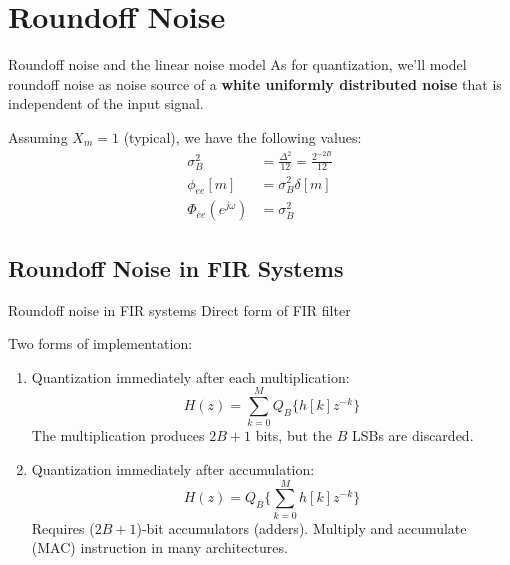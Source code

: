 \documentclass[10pt]{beamer}
\begin{document}
%
\section{Roundoff Noise}
\begin{frame}{Roundoff noise and the linear noise model}
As for quantization, we'll model roundoff noise as noise source of a \textbf{white uniformly distributed noise} that is independent of the input signal. 

\begin{center}
\resizebox{0.6\textwidth}{!}{}
\end{center}

Assuming $X_m = 1$ (typical), we have the following values:
\begin{align*}
\sigma_B^2 &= \frac{\Delta^2}{12} =  \frac{2^{-2B}}{12}\tag{average power} \\
\phi_{ee}[m] &= \sigma_B^2\delta[m] \tag{autocorrelation function} \\
\Phi_{ee}(e^{j\omega}) &= \sigma_B^2 \tag{PSD}
\end{align*}
\end{frame}

\subsection{Roundoff Noise in FIR Systems}
\begin{frame}{Roundoff noise in FIR systems}
	Direct form of FIR filter
	\begin{center}
		\resizebox{0.75\textwidth}{!}{}
	\end{center}
	\vspace{-0.4cm}
	Two forms of implementation:
	\begin{enumerate}
		\item Quantization immediately after each multiplication:
		\begin{equation*}
		H(z) = \sum_{k = 0}^M Q_B\{h[k]z^{-k}\}
		\end{equation*}
		The multiplication produces $2B+1$ bits, but the $B$ LSBs are discarded.
		\item Quantization immediately after accumulation:
		\begin{equation*}
		H(z) = Q_B\bigg\lbrace\sum_{k = 0}^M h[k]z^{-k}\bigg\rbrace
		\end{equation*}
		Requires ($2B+1$)-bit accumulators (adders). Multiply and accumulate (MAC) instruction in many architectures.
	\end{enumerate}	
\end{frame}
\end{document}
